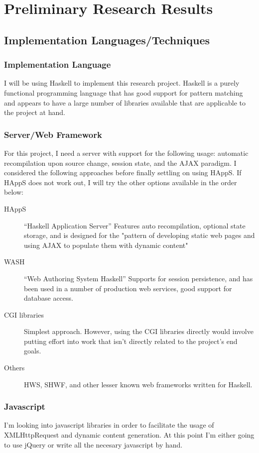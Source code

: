 \documentclass{acm_proc_article-sp}
\begin{document}
\section{Preliminary Research Results}

\subsection{Implementation Languages/Techniques}
\subsubsection{Implementation Language}
I will be using Haskell to implement this research project.  Haskell is a purely functional programming language that has good support for pattern matching and appears to have a large number of  libraries available that are applicable to the project at hand.
\subsubsection{Server/Web Framework}
For this project, I need a server with support for the following usage: automatic recompilation upon source change, session state, and the AJAX paradigm.  I considered the following approaches before finally settling on using HAppS\cite{HAppS}.  If HAppS does not work out, I will try the other options available in the order below:
	\begin{description}
	\item[HAppS] ``Haskell Application Server'' Features auto recompilation, optional state storage, and is designed for the "pattern of developing static web pages and using AJAX to populate them with dynamic content" \cite{HAppS}
	\item[WASH] ``Web Authoring System Haskell'' Supports for session persistence, and has been used in a number of production web services, good support for database access.\cite{WASH}
	\item[CGI libraries] Simplest approach.  However, using the CGI libraries directly would involve putting effort into work that isn't directly related to the project's end goals.
	\item[Others] HWS, SHWF, and other lesser known web frameworks written for Haskell.
\end{description}
	
\subsubsection{Javascript} 
 I'm looking into javascript libraries in order to facilitate the usage of XMLHttpRequest and dynamic content generation.  At this point I'm either going to use jQuery\cite{jquery} or write all the necesary javascript by hand.
\end{document}
